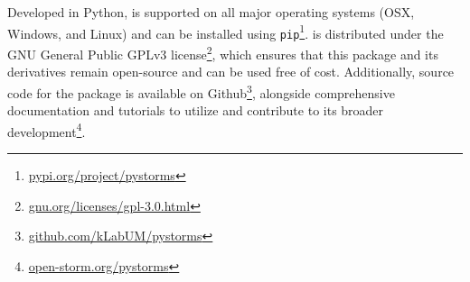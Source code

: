 \section{\pystorms}\label{sec:pystorms}
%
%
%
Developed in Python, \pystorms is supported on all major operating systems (OSX, Windows, and Linux) and can be installed using \texttt{pip}\footnote{\href{https://pypi.org/project/pystorms/}{pypi.org/project/pystorms}}.
\pystorms is distributed under the GNU General Public GPLv3 license\footnote{\href{https://www.gnu.org/licenses/gpl-3.0.html}{gnu.org/licenses/gpl-3.0.html}}, which ensures that this package and its derivatives remain open-source and can be used free of cost. Additionally, source code for the package is available on Github\footnote{\href{https://github.com/kLabUM/pystorms}{github.com/kLabUM/pystorms}}, alongside comprehensive documentation and tutorials to utilize and contribute to its broader development\footnote{\href{http://open-storm.org/pystorms}{open-storm.org/pystorms}}. 
%
%
%

